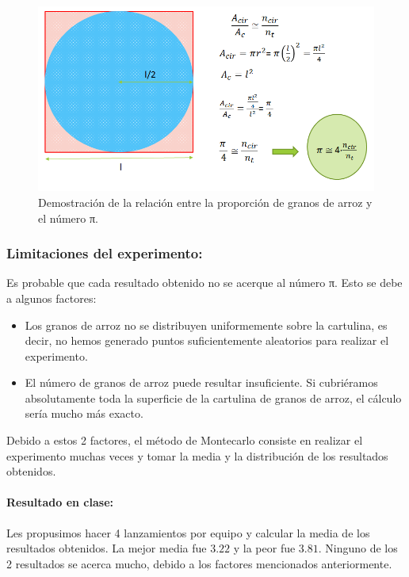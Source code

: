 \begin{figure}[hbtp]
\centering
\includegraphics[scale=0.5]{img/pidemo.png}
\caption{Demostración de la relación entre la proporción de granos de arroz y el número π.}
\label{imgpidemo}
\end{figure}

\subsubsection{Limitaciones del experimento:}

Es probable que cada resultado obtenido no se acerque al número π. Esto se debe a algunos factores:

\label{ProblemasExperimento}
\begin{itemize}
	\item Los granos de arroz no se distribuyen uniformemente sobre la cartulina, es decir, no hemos generado puntos suficientemente aleatorios para realizar el experimento.
	\item El número de granos de arroz puede resultar insuficiente. Si cubriéramos absolutamente toda la superficie de la cartulina de granos de arroz, el cálculo sería mucho más exacto.
\end{itemize}

Debido a estos 2 factores, el método de Montecarlo consiste en realizar el experimento muchas veces y tomar la media y la distribución de los resultados obtenidos.

\paragraph{Resultado en clase:} Les propusimos hacer 4 lanzamientos por equipo y calcular la media de los resultados obtenidos. 
%
La mejor media fue $3.22$ y la peor fue $3.81$. 
%
Ninguno de los 2 resultados se acerca mucho, debido a los factores mencionados anteriormente.


